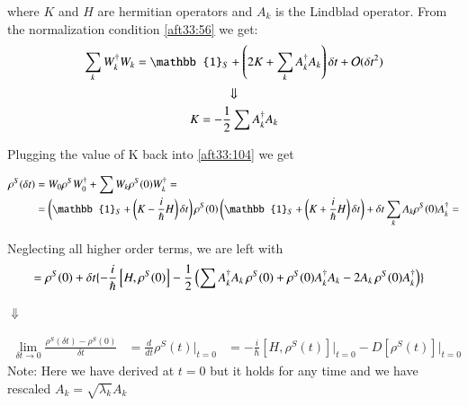 where $K$ and $H$ are hermitian operators and $A_{k}$ is the Lindblad operator. From the normalization condition \eqref{aft33:56} we get:
\begin{gather}
\sum_{k}W_{k}^{\dagger}W_{k}=\mathbb{1}_{S}+\left(2K+\sum_{k}A_{k}^{\dagger}A_{k}\right)\delta{t}+\mathcal{O}(\delta{t}^{2})\label{aft33:106}\\
\Downarrow\notag \\
K=-\frac{1}{2}\sum A_{k}^{\dagger}A_{k}\label{aft33:107}
\end{gather}

Plugging the value of K back into \eqref{aft33:104}  we get 

\begin{align}\label{aft33:108}
\rho^{S}(\delta{t})&=W_{0}{ { \rho  }^{ S } }{ W }_{0}^{ \dagger } +\sum W_{k}{ { \rho  }^{ S } } (0){ W }_{ k }^{ \dagger }=\notag\\
&=\left(\mathbb{1}_{S}+\left(K-\frac{i}{\hslash}H\right)\delta{t}\right)\rho^{S}(0) \left(\mathbb{1}_{S}+\left(K+\frac{i}{\hslash}H\right)\delta{t}\right)+\delta{t}\sum_{k}{A}_{k}\rho^{S}(0){A}_{k}^{\dagger}=
\end{align}

Neglecting all higher order terms, we are left with
\begin{align}\label{aft33:109}
&=\rho^{S}(0)+\delta{t} \lbrace-\frac{i}{\hslash} \left[H,\rho^{S}(0)\right]-\frac{1}{2}\left(\sum A_{k}^{\dagger}A_{k}\thinspace\rho^{S}(0)+\rho^{S}(0)A_{k}^{\dagger}A_{k}-2A_{k}\thinspace\rho^{S}(0)A_{k}^{\dagger} \right)\rbrace
\end{align}
\begin{center}
$\Downarrow $
\end{center}
\begin{align}\label{aft33:110}
\lim _{\delta t\rightarrow 0 }{\frac{{\rho}^{S}\left(\delta t \right)-{\rho}^{S}\left(0\right)}{\delta t}} &=\frac{d}{dt}{\rho}^{S}(t)\vert_{t=0}&=-\frac{i}{\hslash} \left[H,\rho^{S}(t)\right]\vert_{t=0}-D\left[\rho^{S}(t)\right]\vert_{t=0}
\end{align}
Note:
Here we have derived  at $t = 0$ but it holds for any time and we have rescaled ${A}_{k}=\sqrt{{\lambda}_{k}} {A}_{k}$




